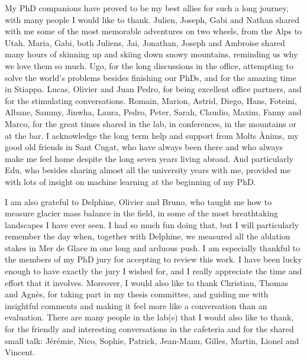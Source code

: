 My PhD companions have proved to be my best allies for such a long journey, with many people I would like to thank. Julien, Joseph, Gabi and Nathan shared with me some of the most memorable adventures on two wheels, from the Alps to Utah. Maria, Gabi, both Juliens, Jai, Jonathan, Joseph and Ambroise shared many hours of skinning up and skiing down snowy mountains, reminding us why we love them so much. Ugo, for the long discussions in the office, attempting to solve the world's problems besides finishing our PhDs, and for the amazing time in Stiappa. Lucas, Olivier and Juan Pedro, for being excellent office partners, and for the stimulating conversations. Romain, Marion, Astrid, Diego, Hans, Foteini, Albane, Sammy, Jinwha, Laura, Pedro, Peter, Sarah, Claudio, Maxim, Fanny and Marco, for the great times shared in the lab, in conferences, in the mountains or at the bar. I acknowledge the long term help and support from Molts Ànims, my good old friends in Sant Cugat, who have always been there and who always make me feel home despite the long seven years living abroad. And particularly Edu, who besides sharing almost all the university years with me, provided me with lots of insight on machine learning at the beginning of my PhD.

I am also grateful to Delphine, Olivier and Bruno, who taught me how to measure glacier mass balance in the field, in some of the most breathtaking landscapes I have ever seen. I had so much fun doing that, but I will particularly remember the day when, together with Delphine, we measured all the ablation stakes in Mer de Glace in one long and arduous push. I am especially thankful to the members of my PhD jury for accepting to review this work. I have been lucky enough to have exactly the jury I wished for, and I really appreciate the time and effort that it involves. Moreover, I would also like to thank Christian, Thomas and Agnès, for taking part in my thesis committee, and guiding me with insightful comments  and making it feel more like a conversation than an evaluation. There are many people in the lab(s) that I would also like to thank, for the friendly and interesting conversations in the cafeteria and for the shared small talk: Jérémie, Nico, Sophie, Patrick, Jean-Manu, Gilles, Martin, Lionel and Vincent. 

